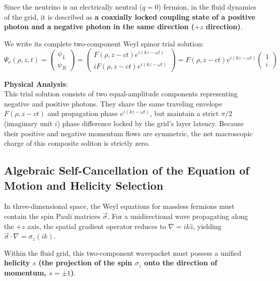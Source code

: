 \documentclass[12pt, a4paper]{article}
\begin{document}
Since the neutrino is an electrically neutral ($q=0$) fermion, in the fluid dynamics of the grid, it is described as \textbf{a coaxially locked coupling state of a positive photon and a negative photon in the same direction ($+z$ direction)}.

We write its complete two-component Weyl spinor trial solution:
\begin{equation}
\Psi_\nu(\rho, z, t) = \begin{pmatrix} \psi_L \\ \psi_R \end{pmatrix} = \begin{pmatrix} F(\rho, z-ct) e^{i(kz-\omega t)} \\ i F(\rho, z-ct) e^{i(kz-\omega t)} \end{pmatrix} = F(\rho, z-ct) e^{i(kz-\omega t)} \begin{pmatrix} 1 \\ i \end{pmatrix} \label{eq:neutrino_ansatz_final}
\end{equation}

\textbf{Physical Analysis}: \\
This trial solution consists of two equal-amplitude components representing negative and positive photons. They share the same traveling envelope $F(\rho, z-ct)$ and propagation phase $e^{i(kz-\omega t)}$, but maintain a strict $\pi/2$ (imaginary unit $i$) phase difference locked by the grid's layer latency. Because their positive and negative momentum flows are symmetric, the net macroscopic charge of this composite soliton is strictly zero.

\subsection{Algebraic Self-Cancellation of the Equation of Motion and Helicity Selection}

In three-dimensional space, the Weyl equations for massless fermions must contain the spin Pauli matrices $\vec{\sigma}$. For a unidirectional wave propagating along the $+z$ axis, the spatial gradient operator reduces to $\nabla = ik \hat{z}$, yielding $\vec{\sigma} \cdot \nabla = \sigma_z (ik)$.

Within the fluid grid, this two-component wavepacket must possess a unified \textbf{helicity $s$ (the projection of the spin $\sigma_z$ onto the direction of momentum, $s = \pm 1$)}.
\end{document}
